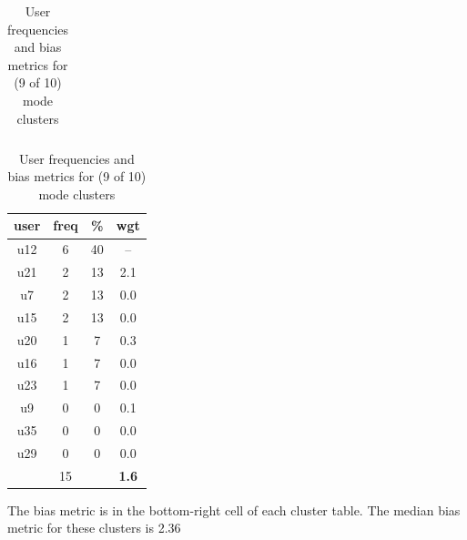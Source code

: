 \begin{table}
\begin{tabular}{ |c|c|c|c| }
	\hline
\end{tabular}
\begin{tabular}{ |c|c|c|c| }
	\hline
	\textbf{user} & \textbf{freq} & \textbf{\%} & \textbf{wgt} \\
	\hline
	u12 & 6 & 40 & -- \\
	u21 & 2 & 13 & 2.1 \\
	u7 & 2 & 13 & 0.0 \\
	u15 & 2 & 13 & 0.0 \\
	u20 & 1 & 7 & 0.3 \\
	u16 & 1 & 7 & 0.0 \\
	u23 & 1 & 7 & 0.0 \\
	u9 & 0 & 0 & 0.1 \\
	u35 & 0 & 0 & 0.0 \\
	u29 & 0 & 0 & 0.0 \\
	 & 15 & & \textbf{1.6} \\
	\hline
\end{tabular}
\caption{User frequencies and bias metrics for (9 of 10) mode clusters}
{\small The bias metric is in the bottom-right cell of each cluster table. The median bias metric for these clusters is 2.36}
\end{table}

